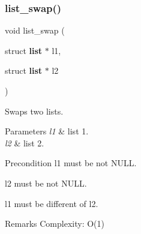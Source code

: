 \subsubsection{list\+\_\+swap()}
{\footnotesize\ttfamily void list\+\_\+swap (\begin{DoxyParamCaption}\item[{struct \textbf{ list} $\ast$}]{l1,  }\item[{struct \textbf{ list} $\ast$}]{l2 }\end{DoxyParamCaption})\hspace{0.3cm}{\ttfamily [inline]}}

Swaps two lists.


\begin{DoxyParams}{Parameters}
{\em l1} & list 1. \\
\hline
{\em l2} & list 2.\\
\hline
\end{DoxyParams}
\begin{DoxyPrecond}{Precondition}
{\ttfamily l1} must be not N\+U\+LL. 

{\ttfamily l2} must be not N\+U\+LL. 

{\ttfamily l1} must be different of {\ttfamily l2}.
\end{DoxyPrecond}
\begin{DoxyRemark}{Remarks}
Complexity\+: O(1) 
\end{DoxyRemark}
